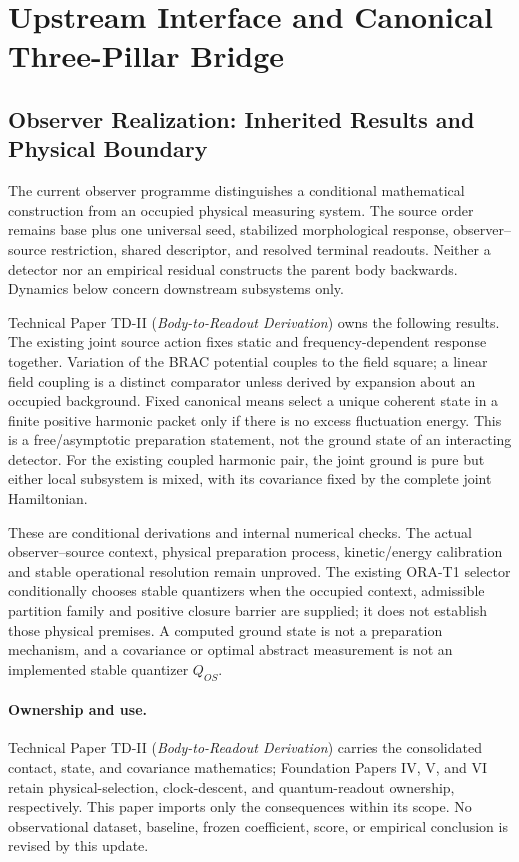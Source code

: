 \documentclass[11pt]{article}
\begin{document}
\section{Upstream Interface and Canonical Three-Pillar Bridge}\label{sec:upstream-three-pillar-bridge}

\subsection{Observer Realization: Inherited Results and Physical Boundary}
\label{sec:observer-update-20260914}
The current observer programme distinguishes a conditional mathematical
construction from an occupied physical measuring system. The source order
remains base plus one universal seed, stabilized morphological response,
observer--source restriction, shared descriptor, and resolved terminal
readouts. Neither a detector nor an empirical residual constructs the parent
body backwards. Dynamics below concern downstream subsystems only.

Technical Paper TD-II (\emph{Body-to-Readout Derivation}) owns the following
results. The existing joint source action fixes static and frequency-dependent
response together. Variation of the BRAC potential couples to the field
square; a linear field coupling is a distinct comparator unless derived by
expansion about an occupied background. Fixed canonical means select a unique
coherent state in a finite positive harmonic packet only if there is no excess
fluctuation energy. This is a free/asymptotic preparation statement, not the
ground state of an interacting detector. For the existing coupled harmonic
pair, the joint ground is pure but either local subsystem is mixed, with its
covariance fixed by the complete joint Hamiltonian.

These are conditional derivations and internal numerical checks. The actual
observer--source context, physical preparation process, kinetic/energy
calibration and stable operational resolution remain unproved. The existing
ORA-T1 selector conditionally chooses stable quantizers when the occupied
context, admissible partition family and positive closure barrier are supplied;
it does not establish those physical premises. A computed ground state is not
a preparation mechanism, and a covariance or optimal abstract measurement is
not an implemented stable quantizer $Q_{OS}$.

\paragraph{Ownership and use.}
Technical Paper TD-II (\emph{Body-to-Readout Derivation}) carries the
consolidated contact, state, and covariance mathematics; Foundation Papers IV,
V, and VI retain physical-selection, clock-descent, and quantum-readout
ownership, respectively. This paper imports only the consequences within its
scope. No observational dataset, baseline, frozen coefficient, score, or
empirical conclusion is revised by this update.
\end{document}
